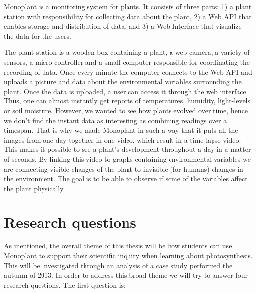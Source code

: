 Monoplant is a monitoring system for plants. It consists of three parts: 1) a plant station with responsibility for collecting data about the plant, 2) a Web API that enables storage and distribution of data, and 3) a Web Interface that visualize the data for the users. 

The plant station is a wooden box containing a plant, a web camera, a variety of sensors, a micro controller and a small computer responsible for coordinating the recording of data. Once every minute the computer connects to the Web API and uploads a picture and data about the environmental variables surrounding the plant. Once the data is uploaded, a user can access it through the web interface. Thus, one can almost instantly get reports of temperatures, humidity, light-levels or soil moisture. However, we wanted to see how plants evolved over time, hence we don't find the instant data as interesting as combining readings over a timespan. That is why we made Monoplant in such a way that it puts all the images from one day together in one video, which result in a time-lapse video. This makes it possible to see a plant's development throughout a day in a matter of seconds. By linking this video to graphs containing environmental variables we are connecting visible changes of the plant to invisible (for humans) changes in the environment. The goal is to be able to observe if some of the variables affect the plant physically. 


\section{Research questions}
As mentioned, the overall theme of this thesis will be how students can use Monoplant to support their scientific inquiry when learning about photosynthesis. This will be investigated through an analysis of a case study performed the autumn of 2013. In order to address this broad theme we will try to answer four research questions. The first question is: 

